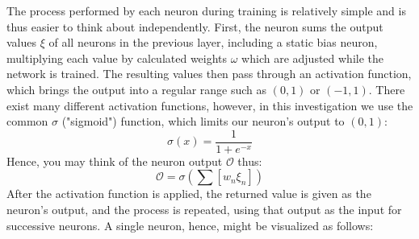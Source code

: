 \documentclass{article}
\begin{document}
The process performed by each neuron during training is relatively simple and is thus easier to think about independently. First, the neuron sums the output values $\xi$ of all neurons in the previous layer, including a static bias neuron, multiplying each value by calculated weights $\omega$ which are adjusted while the network is trained. The resulting values then pass through an activation function, which brings the output into a regular range such as $(0, 1)$ or $(-1, 1)$. There exist many different activation functions, however, in this investigation we use the common $\sigma$ ("sigmoid") function, which limits our neuron's output to $(0, 1)$:
$$\sigma(x)=\frac{1}{1+e^{-x}}$$
Hence, you may think of the neuron output $\mathcal{O}$ thus:
$$\mathcal{O}=\sigma(\sum[w_{n}\xi_{n}])$$
After the activation function is applied, the returned value is given as the neuron's output, and the process is repeated, using that output as the input for successive neurons. A single neuron, hence, might be visualized as follows:

\begin{center}
\end{center}
\end{document}
